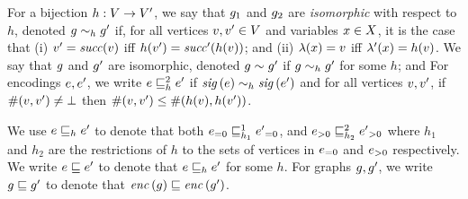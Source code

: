For a bijection
$h:V\rightarrow V'$, we say that $g_1$ and $g_2$ are {\it isomorphic}
with respect to $h$, denoted $g\sim_hg'$
if, for all vertices $v,v'\in V$ and variables $x\in X$,
it is the case that
(i) $v'={\it succ}(v)$ iff $h(v')={\it succ}'(h(v))$; and
(ii) $\lambda(x)=v$ iff $\lambda'(x)=h(v)$.
%
We say that $g$ and $g'$ are isomorphic, denoted $g\sim g'$
if $g\sim_hg'$ for some $h$; and
%
For encodings $e,e'$, we write $e\sqsubseteq^2_he'$ if 
${\it sig}\left(e\right)\sim_h{\it sig}\left(e'\right)$ and for all vertices $v,v'$,
if $\#(v,v')\neq\bot$ then  $\#(v,v')\leq\#(h(v),h(v'))$.
%



We use $e\sqsubseteq_he'$ to denote that both
${e}_{=0}\sqsubseteq^1_{h_1}{e'}_{=0}$,
and
${e}_{>0}\sqsubseteq^2_{h_2}{e'}_{>0}$
where $h_1$ and $h_2$ are the restrictions of $h$ to the sets of vertices in
${e}_{=0}$ and ${e}_{>0}$ respectively.
%
We write $e\sqsubseteq e'$ to denote that
$e\sqsubseteq_he'$ for some $h$.
%
For graphs $g,g'$, we write $g\sqsubseteq g'$
to denote that ${\it enc}\left(g\right)\sqsubseteq{\it enc}\left(g'\right)$.


